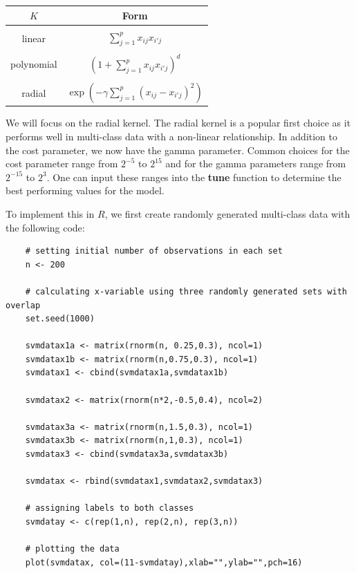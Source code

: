 \documentclass[12pt]{article}
\begin{document}
\begin{center}
    \begin{tabular}{c|c}
        \(K\) & Form \\
        \hline \\
        linear & \(\sum_{j=1}^p x_{ij}x_{i'j}\) \\
          \\

        polynomial & \((1+ \sum_{j=1}^p x_{ij}x_{i'j})^d \) \\
          \\

        radial & \(\exp ( - \gamma \sum_{j=1}^p (x_{ij}-x_{i'j})^2) \)
    \end{tabular}
\end{center}

We will focus on the radial kernel. The radial kernel is a popular first choice as it performs well in multi-class data with a non-linear relationship. In addition to the cost parameter, we now have the gamma parameter. Common choices for the cost parameter range from \(2^{-5}\) to \(2^{15}\) and for the gamma parameters range from \(2^{-15}\) to \(2^{3}\). One can input these ranges into the \textbf{tune} function to determine the best performing values for the model.

To implement this in $R$, we first create randomly generated multi-class data with the following code:

\begin{verbatim}
    # setting initial number of observations in each set
    n <- 200

    # calculating x-variable using three randomly generated sets with overlap
    set.seed(1000)

    svmdatax1a <- matrix(rnorm(n, 0.25,0.3), ncol=1)
    svmdatax1b <- matrix(rnorm(n,0.75,0.3), ncol=1)
    svmdatax1 <- cbind(svmdatax1a,svmdatax1b)

    svmdatax2 <- matrix(rnorm(n*2,-0.5,0.4), ncol=2)

    svmdatax3a <- matrix(rnorm(n,1.5,0.3), ncol=1)
    svmdatax3b <- matrix(rnorm(n,1,0.3), ncol=1)
    svmdatax3 <- cbind(svmdatax3a,svmdatax3b)

    svmdatax <- rbind(svmdatax1,svmdatax2,svmdatax3)

    # assigning labels to both classes
    svmdatay <- c(rep(1,n), rep(2,n), rep(3,n))

    # plotting the data
    plot(svmdatax, col=(11-svmdatay),xlab="",ylab="",pch=16)
\end{verbatim}
\end{document}
